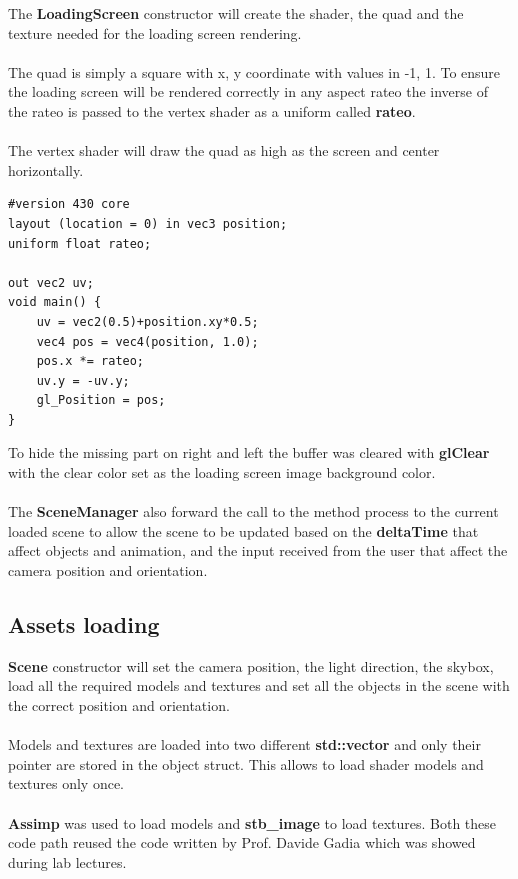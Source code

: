\documentclass[12pt, a4paper]{article}
\begin{document}
The \textbf{LoadingScreen} constructor will create the shader, the quad and the texture needed for the loading screen
rendering.\\\\
The quad is simply a square with x, y coordinate with values in -1, 1. To ensure the loading screen will be rendered correctly
in any aspect rateo the inverse of the rateo is passed to the vertex shader as a uniform called \textbf{rateo}.\\\\
The vertex shader will draw the quad as high as the screen and center horizontally.
\begin{lstlisting}[caption={Loading screen vertex shader},captionpos=b]
#version 430 core
layout (location = 0) in vec3 position;
uniform float rateo;
    
out vec2 uv;
void main() {
    uv = vec2(0.5)+position.xy*0.5;
    vec4 pos = vec4(position, 1.0);
    pos.x *= rateo;
    uv.y = -uv.y;
    gl_Position = pos;
}
\end{lstlisting}
To hide the missing part on right and left
the buffer was cleared with \textbf{glClear} with the clear color set as the loading screen image background color.\\\\
The \textbf{SceneManager} also forward the call to the method process to the current loaded scene to allow the scene
to be updated based on the \textbf{deltaTime} that affect objects and animation, and the input received from the user
that affect the camera position and orientation.

\subsection{Assets loading}
\textbf{Scene} constructor will set the camera position, the light direction, the skybox, load all the required models and textures
and set all the objects in the scene with the correct position and orientation.\\\\
Models and textures are loaded into two different \textbf{std::vector} and only their pointer are stored in the object struct.
This allows to load shader models and textures only once.\\\\
\textbf{Assimp} was used to load models and \textbf{stb\_image} to load textures. Both these code path
reused the code written by Prof. Davide Gadia which was showed during lab lectures.
\end{document}
